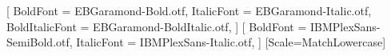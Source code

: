 %
%

\providecommand*\BookTrim{letter}
\def\PlexHeads{}   %


\usepackage{amsmath}
\usepackage{amsthm}
\usepackage{unicode-math}

\setmainfont{EBGaramond-Regular.otf}[
  BoldFont = EBGaramond-Bold.otf,
  ItalicFont = EBGaramond-Italic.otf,
  BoldItalicFont = EBGaramond-BoldItalic.otf,
]
\setsansfont{IBMPlexSans-Regular.otf}[
  BoldFont = IBMPlexSans-SemiBold.otf,
  ItalicFont = IBMPlexSans-Italic.otf,
]
\setmonofont{JetBrainsMono-Regular.otf}[Scale=MatchLowercase]

\newfontfamily{}
\newfontfamily{}
\newfontfamily{}

\usepackage{microtype} %

\linespread{1.08}


\ifdefined\PlexHeads
  \newcommand\headfont{\plexsemibold}
  \newcommand\kickerfont{\plexmedium\addfontfeatures{LetterSpace=14}}
\else
  \newcommand\headfont{\garamondsemibold}
  \newcommand\kickerfont{\garamondsemibold\addfontfeatures{LetterSpace=14}\scshape}
\fi

